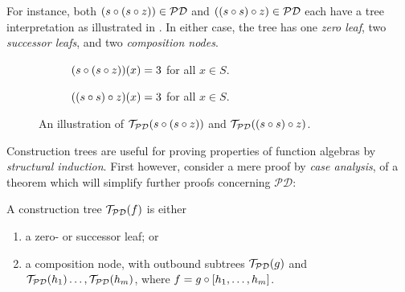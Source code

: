 For instance, both $\p{s \circ \p{s \circ z}} \in \mathcal{PD}$ and $\p{\p{s
\circ s} \circ z} \in \mathcal{PD}$ each have a tree interpretation as
illustrated in . In either case, the tree has one
\emph{zero leaf}, two \emph{successor leafs}, and two \emph{composition nodes}.

\begin{figure}[h!]
\centering
%
\begin{subfigure}{0.49\textwidth}
\centering
{}
\caption[]{$\p{s \circ \p{s \circ z}}\p{x} = 3$ for all $x \in S$.}
\end{subfigure}
%
\begin{subfigure}{0.49\textwidth}
\centering
{}
\caption[]{$\p{\p{s \circ s} \circ z}\p{x} = 3$ for all $x \in S$.}
\end{subfigure}
\caption[]{An illustration of $\mathcal{T}_\mathcal{PD}\p{s \circ \p{s \circ
z}}$ and $\mathcal{T}_\mathcal{PD}\p{\p{s \circ s} \circ z}$.}
\label{fig:mirror-s-s-z}
\end{figure}

Construction trees are useful for proving properties of function algebras by
\emph{structural induction}. First however, consider a mere proof by \emph{case
analysis}, of a theorem which will simplify further proofs concerning
$\mathcal{PD}$:

\begin{theorem} \label{thm:construction-tree-p} A construction tree
$\mathcal{T}_\mathcal{PD}\p{f}$ is either\begin{enumerate}[label=(\arabic*)]

\item a zero- or successor leaf; or

\item a composition node, with outbound subtrees
$\mathcal{T}_\mathcal{PD}\p{g}$ and $\mathcal{T}_\mathcal{PD}\p{h_1} \ldots,
\mathcal{T}_\mathcal{PD}\p{h_m}$, where $f = g \circ \seq{h_1, \ldots, h_m}$.

\end{enumerate}\end{theorem}

